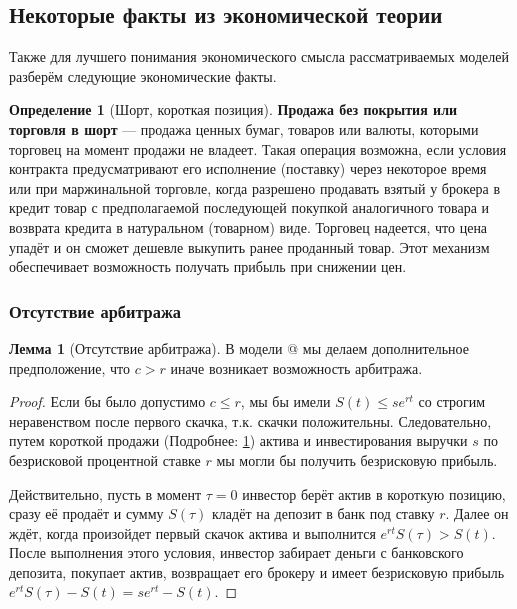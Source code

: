 \documentclass[a4paper,12pt]{article}
\makeatletter
\theoremstyle{definition}
\newtheorem{definition}{Определение}[section]
\newtheorem{lemma}{Лемма}
\newcommand*{\rom}[1]{\expandafter\@slowromancap\romannumeral #1@}
\makeatother
\begin{document}
\subsection{Некоторые факты из экономической теории}

Также для лучшего понимания экономического смысла рассматриваемых моделей разберём следующие экономические факты.

\begin{definition}[Шорт, короткая позиция]
    \label{def:short_position}
    \textbf{Продажа без покрытия или торговля в шорт} --- продажа ценных бумаг, товаров или валюты, которыми торговец на момент продажи не владеет. Такая операция возможна, если условия контракта предусматривают его исполнение (поставку) через некоторое время или при маржинальной торговле, когда разрешено продавать взятый у брокера в кредит товар с предполагаемой последующей покупкой аналогичного товара и возврата кредита в натуральном (товарном) виде. Торговец надеется, что цена упадёт и он сможет дешевле выкупить ранее проданный товар. Этот механизм обеспечивает возможность получать прибыль при снижении цен.
\end{definition}

\subsubsection{Отсутствие арбитража}

\begin{lemma}[Отсутствие арбитража]\label{thm:no_arbitrage_theoreme}
В модели \rom{2} мы делаем дополнительное предположение, что $c > r$ иначе возникает возможность арбитража. 
\end{lemma}
\begin{proof}
Если бы было допустимо $c \le r$, мы бы имели $S(t) \le s e^{rt}$ со строгим неравенством после первого скачка, т.к. скачки положительны. Следовательно, путем короткой продажи (Подробнее: \ref{def:short_position}) актива и инвестирования выручки $s$ по безрисковой процентной ставке $r$ мы могли бы получить безрисковую прибыль.

Действительно, пусть в момент $\tau = 0$ инвестор берёт актив в короткую позицию, сразу её продаёт и сумму $S(\tau)$ кладёт на депозит в банк под ставку $r$. Далее он ждёт, когда произойдет первый скачок актива и выполнится $e^{rt} S(\tau) > S(t)$. После выполнения этого условия, инвестор забирает деньги с банковского депозита, покупает актив, возвращает его брокеру и имеет безрисковую прибыль $e^{rt}S(\tau) - S(t) = s e^{rt} - S(t)$.
\end{proof}
\end{document}
